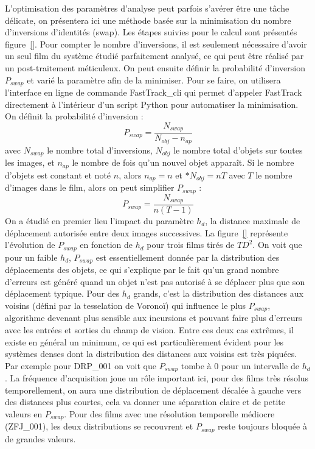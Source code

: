 	L'optimisation des paramètres d'analyse peut parfois s'avérer être une tâche délicate, on présentera ici une méthode basée sur la minimisation du nombre d'inversions d'identités (swap). Les étapes suivies pour le calcul sont présentés figure~\ref{}. Pour compter le nombre d'inversions, il est seulement nécessaire d'avoir un seul film du système étudié parfaitement analysé, ce qui peut être réalisé par un post-traitement méticuleux. On peut ensuite définir la probabilité d'inversion $P_{swap}$ et varié la paramètre afin de la minimiser. Pour se faire, on utilisera l'interface en ligne de commande FastTrack\_cli qui permet d'appeler FastTrack directement à l'intérieur d'un script Python pour automatiser la minimisation. On définit la probabilité d'inversion :
	$$
	    P_{swap}=\frac{N_{swap}}{N_{obj}-n_{ap}}
	$$
	avec $N_{swap}$ le nombre total d'inversions, $N_{obj}$ le nombre total d'objets sur toutes les images, et $n_{ap}$ le nombre de fois qu'un nouvel objet apparaît. Si le nombre d'objets est constant et noté $n$, alors $n_{ap}=n$ et $*N_{obj}=nT$ avec $T$ le nombre d'images dans le film, alors on peut simplifier $P_{swap}$ :
    $$
	    P_{swap}=\frac{N_{swap}}{n(T-1)}
	$$
	On a étudié en premier lieu l'impact du paramètre $h_d$, la distance maximale de déplacement autorisée entre deux images successives. La figure~\ref{} représente l'évolution de $P_{swap}$ en fonction de $h_d$ pour trois films tirés de $TD^2$. On voit que pour un faible $h_d$, $P_{swap}$ est essentiellement donnée par la distribution des déplacements des objets, ce qui s'explique par le fait qu'un grand nombre d'erreurs est généré quand un objet n'est pas autorisé à se déplacer plus que son déplacement typique. Pour des $h_d$ grands, c'est la distribution des distances aux voisins (défini par la tesselation de Voronoï) qui influence le plus $P_{swap}$, algorithme devenant plus sensible aux incursions et pouvant faire plus d'erreurs avec les entrées et sorties du champ de vision.
	Entre ces deux cas extrêmes, il existe en général un minimum, ce qui est particulièrement évident pour les systèmes denses dont la distribution des distances aux voisins est très piquées. Par exemple pour DRP\_001 on voit que $P_{swap}$ tombe à 0 pour un intervalle de $h_d$. La fréquence d'acquisition joue un rôle important ici, pour des films très résolus temporellement, on aura une distribution de déplacement décalée à gauche vers des distances plus courtes, cela va donner une séparation claire et de petite valeurs en $P_{swap}$. Pour des films avec une résolution temporelle médiocre (ZFJ\_001), les deux distributions se recouvrent et $P_{swap}$ reste toujours bloquée à de grandes valeurs.


